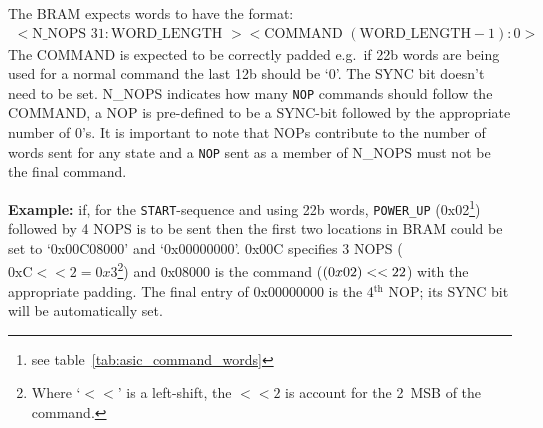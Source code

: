 The BRAM expects words to have the format:
\begin{align}\label{fmt:tx_bram}
  <\text{N\_NOPS } 31:\text{WORD\_LENGTH }><\text{COMMAND } (\text{WORD\_LENGTH} - 1):0>
\end{align}
The COMMAND is expected to be correctly padded e.g.\ if 22b words are being used for a normal command the last 12b should be `0'. The SYNC bit doesn't need to be set. N\_NOPS indicates how many \texttt{NOP} commands should follow the COMMAND, a NOP is pre-defined to be a SYNC-bit followed by the appropriate number of 0's. It is important to note that NOPs contribute to the number of words sent for any state and a \texttt{NOP} sent as a member of N\_NOPS must not be the final command.

\textbf{Example:} if, for the \texttt{START}-sequence and using 22b words, \texttt{POWER\_UP} (0x02\footnote{see table~\ref{tab:asic_command_words}}) followed by 4 NOPS is to be sent then the first two locations in BRAM could be set to `0x00C08000' and `0x00000000'. 0x00C specifies 3 NOPS (\(\text{0xC}<<2 = 0x3\)\footnote{Where `\(<<\)' is a left-shift, the \( <<2 \) is account for the 2~MSB of the command.}) and 0x08000 is the command (\(\text(0x02) << 22 \)) with the appropriate padding. The final entry of 0x00000000 is the 4\(^{\text{th}}\) NOP; its SYNC bit will be automatically set.
